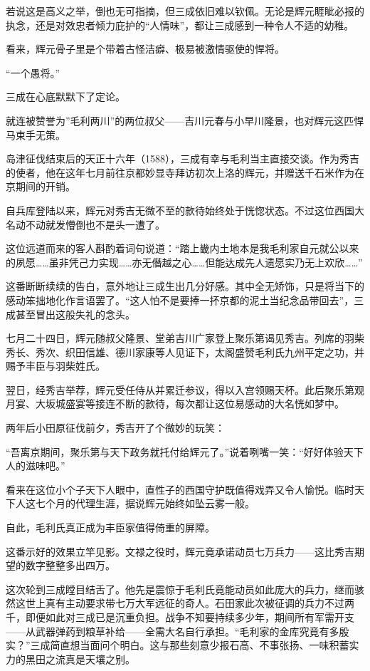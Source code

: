 \documentclass[
]{book}
\begin{document}
若说这是高义之举，倒也无可指摘，但三成依旧难以钦佩。无论是辉元睚眦必报的执念，还是对效忠者倾力庇护的``人情味''，都让三成感到一种令人不适的幼稚。

看来，辉元骨子里是个带着古怪洁癖、极易被激情驱使的悍将。

``一个愚将。''

三成在心底默默下了定论。

就连被赞誉为''毛利两川''的两位叔父------吉川元春与小早川隆景，也对辉元这匹悍马束手无策。

岛津征伐结束后的天正十六年（1588），三成有幸与毛利当主直接交谈。作为秀吉的使者，他在这年七月前往京都妙显寺拜访初次上洛的辉元，并赠送千石米作为在京期间的开销。

自兵库登陆以来，辉元对秀吉无微不至的款待始终处于恍惚状态。不过这位西国大名动不动就发懵倒也不是头一遭了。

这位远道而来的客人斟酌着词句说道：``踏上畿内土地本是我毛利家自元就公以来的夙愿\ldots\ldots 虽非凭己力实现\ldots\ldots 亦无僭越之心\ldots\ldots 但能达成先人遗愿实乃无上欢欣\ldots\ldots{}''

这番断断续续的告白，意外地让三成生出几分好感。其中全无矫饰，只是将当下的感动笨拙地化作言语罢了。``这人怕不是要捧一抔京都的泥土当纪念品带回去''，三成甚至冒出这般失礼的念头。

七月二十四日，辉元随叔父隆景、堂弟吉川广家登上聚乐第谒见秀吉。列席的羽柴秀长、秀次、织田信雄、德川家康等人见证下，太阁盛赞毛利氏九州平定之功，并赐予丰臣与羽柴姓氏。

翌日，经秀吉举荐，辉元受任侍从并累迁参议，得以入宫领赐天杯。此后聚乐第观月宴、大坂城盛宴等接连不断的款待，每次都让这位易感动的大名恍如梦中。

两年后小田原征伐前夕，秀吉开了个微妙的玩笑：

``吾离京期间，聚乐第与天下政务就托付给辉元了。''说着咧嘴一笑：``好好体验天下人的滋味吧。''

看来在这位小个子天下人眼中，直性子的西国守护既值得戏弄又令人愉悦。临时天下人这七个月的代理生涯，据说辉元始终如坠云雾一般。

自此，毛利氏真正成为丰臣家值得倚重的屏障。

这番示好的效果立竿见影。文禄之役时，辉元竟承诺动员七万兵力------这比秀吉期望的数字整整多出四万。

这次轮到三成瞠目结舌了。他先是震惊于毛利氏竟能动员如此庞大的兵力，继而骇然这世上真有主动要求带七万大军远征的奇人。石田家此次被征调的兵力不过两千，即便如此对三成已是沉重负担。战争不知要持续多少年，期间所有军需开支------从武器弹药到粮草补给------全需大名自行承担。``毛利家的金库究竟有多殷实？''三成简直想当面问个明白。这与那些刻意少报石高、不事张扬、一味积蓄实力的黑田之流真是天壤之别。
\end{document}
